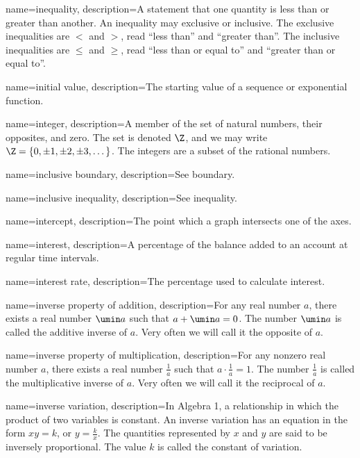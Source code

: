  {
	name=inequality,
	description={A statement that one quantity is less than or greater than another. An inequality may exclusive or inclusive. The exclusive inequalities are $<$ and $>$, read ``less than'' and ``greater than''. The inclusive inequalities are $\leq$ and $\geq$, read ``less than or equal to'' and ``greater than or equal to''.}
}

 {
	name=initial value,
	description={The starting value of a sequence or exponential function.}
}

 {
	name=integer,
	description={A member of the set of natural numbers, their opposites, and zero. The set is denoted $\Z$, and we may write $\Z = \{0, \pm1, \pm2, \pm3, \dotsc \}$. The integers are a subset of the rational numbers.}
}

 {
	name=inclusive boundary,
	description={See \gls{boundary}.}
}

 {
	name=inclusive inequality,
	description={See \gls{inequality}.}
}

 {
	name=intercept,
	description={The point which a graph intersects one of the axes.}
}

 {
	name=interest,
	description={A percentage of the balance added to an account at regular time intervals.}
}

 {
	name=interest rate,
	description={The percentage used to calculate interest.}
}

 {
	name=inverse property of addition,
	description={For any real number $a$, there exists a real number $\umin a$ such that $a + \umin a = 0$. The number $\umin a$ is called the \gls{additive inverse} of $a$. Very often we will call it the \gls{opposite} of $a$.}
}

 {
	name=inverse property of multiplication,
	description={For any nonzero real number $a$, there exists a real number $\frac{1}{a}$ such that $a \cdot \frac{1}{a} = 1$. The number $\frac{1}{a}$ is called the \gls{multiplicative inverse} of $a$. Very often we will call it the \gls{reciprocal} of $a$.}
}


 {
	name=inverse variation,
	description={In Algebra 1, a relationship in which the product of two variables is constant. An inverse variation has an equation in the form $xy = k$, or $y = \frac{k}{x}$. The quantities represented by $x$ and $y$ are said to be \gls{inversely proportional}. The value $k$ is called the \gls{constant of variation}.}
}

